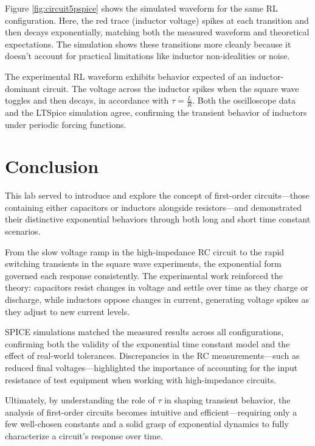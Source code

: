 \documentclass[12pt]{article}
\begin{document}
Figure \ref{fig:circuit5pspice} shows the simulated waveform for the same RL configuration. Here, the red trace (inductor voltage) spikes at each transition and then decays exponentially, matching both the measured waveform and theoretical expectations. The simulation shows these transitions more cleanly because it doesn’t account for practical limitations like inductor non-idealities or noise.

The experimental RL waveform exhibits behavior expected of an inductor-dominant circuit. The voltage across the inductor spikes when the square wave toggles and then decays, in accordance with $\tau = \frac{L}{R}$. Both the oscilloscope data and the LTSpice simulation agree, confirming the transient behavior of inductors under periodic forcing functions.
\section{Conclusion}

This lab served to introduce and explore the concept of first-order circuits—those containing either capacitors or inductors alongside resistors—and demonstrated their distinctive exponential behaviors through both long and short time constant scenarios. 

From the slow voltage ramp in the high-impedance RC circuit to the rapid switching transients in the square wave experiments, the exponential form governed each response consistently. The experimental work reinforced the theory: capacitors resist changes in voltage and settle over time as they charge or discharge, while inductors oppose changes in current, generating voltage spikes as they adjust to new current levels.

SPICE simulations matched the measured results across all configurations, confirming both the validity of the exponential time constant model and the effect of real-world tolerances. Discrepancies in the RC measurements—such as reduced final voltages—highlighted the importance of accounting for the input resistance of test equipment when working with high-impedance circuits.

Ultimately, by understanding the role of $\tau$ in shaping transient behavior, the analysis of first-order circuits becomes intuitive and efficient—requiring only a few well-chosen constants and a solid grasp of exponential dynamics to fully characterize a circuit's response over time.
\end{document}
